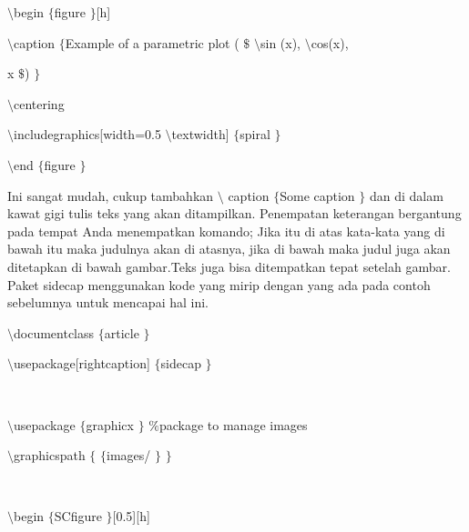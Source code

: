 \noindent
 $  \setminus $begin $  \{  $figure $  \}  $[h] \par
\vspace{12pt}
\noindent
 $  \setminus $caption $  \{  $Example of a parametric plot ( $  \$  $ $  \setminus $sin (x),  $  \setminus $cos(x), \par
\vspace{12pt}
\noindent
 x $  \$  $) $  \}  $ \par
\vspace{12pt}
\noindent
 $  \setminus $centering \par
\vspace{12pt}
\noindent
 $  \setminus $includegraphics[width=0.5 $  \setminus $textwidth] $  \{  $spiral $  \}  $ \par
\vspace{12pt}
\noindent
 $  \setminus $end $  \{  $figure $  \}  $ \par
\vspace{12pt}
\vspace{16pt}
\noindent
 \hspace*{0.5in} Ini sangat mudah, cukup tambahkan  $  \setminus $ caption  $  \{  $Some caption $  \}  $ dan di dalam kawat gigi tulis teks yang akan ditampilkan. Penempatan keterangan bergantung pada tempat Anda menempatkan komando; Jika itu di atas kata-kata yang di bawah itu maka judulnya akan di atasnya, jika di bawah maka judul juga akan ditetapkan di bawah gambar.Teks juga bisa ditempatkan tepat setelah gambar. Paket sidecap menggunakan kode yang mirip dengan yang ada pada contoh sebelumnya untuk mencapai hal ini. \par
\vspace{16pt}
\vspace{16pt}
\noindent
 $  \setminus $documentclass $  \{  $article $  \}  $ \par
\vspace{12pt}
\noindent
 $  \setminus $usepackage[rightcaption] $  \{  $sidecap $  \}  $ \par
\noindent
 $  $ \par
\noindent
 $  \setminus $usepackage $  \{  $graphicx $  \}  $  $  \%  $package to manage images \par
\vspace{12pt}
\noindent
 $  \setminus $graphicspath $  \{  $  $  \{  $images/ $  \}  $  $  \}  $ \par
\noindent
 $  $ \par
\noindent
 $  \setminus $begin $  \{  $SCfigure $  \}  $[0.5][h] \par
